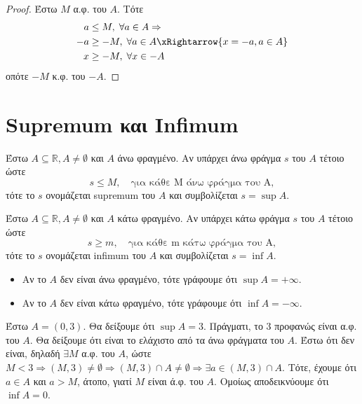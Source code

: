 \documentclass[main.tex]{subfiles}
\begin{document}
\begin{proof}
    Έστω $M$ α.φ. του $A$. Τότε 
    \begin{align*}
        a &\leq M, \; \forall a \in A \Rightarrow  \\
        -a &\geq -M, \; \forall a \in A \xRightarrow{x= -a, a \in A} \\
        x &\geq -M, \; \forall x \in -A
    \end{align*}
    οπότε $ -M $  κ.φ. του $ -A $.
\end{proof}

\section{Supremum και Infimum}

\begin{dfn}
    Έστω $ A \subseteq \mathbb{R}, A \neq \emptyset $ και $A$ άνω 
    φραγμένο. Αν υπάρχει άνω φράγμα $s$ του $A$ τέτοιο ώστε 
    \[
        s \leq M, \quad \text{για κάθε M άνω φράγμα του A}, 
    \] 
    τότε το $s$ ονομάζεται supremum του $A$ και συμβολίζεται $ s=\sup A $.
\end{dfn}

\begin{dfn}
    Έστω $ A \subseteq \mathbb{R}, A \neq \emptyset $ και $A$ κάτω 
    φραγμένο. Αν υπάρχει κάτω φράγμα $s$ του $A$ τέτοιο ώστε 
    \[
        s \geq m, \quad \text{για κάθε m κάτω φράγμα του A}, 
    \] 
    τότε το $s$ ονομάζεται infimum του $A$ και συμβολίζεται $ s=\inf A $.
\end{dfn}

\begin{rem}
\item {}
    \begin{itemize}
        \item Αν το $A$ δεν είναι άνω φραγμένο, τότε γράφουμε ότι $ \sup A = 
            + \infty $.
        \item Αν το $A$ δεν είναι κάτω φραγμένο, τότε γράφουμε ότι $ \inf A = 
            - \infty $.
    \end{itemize}
\end{rem}

\begin{example}
    Έστω $ A = (0,3) $. Θα δείξουμε ότι $ \sup A = 3 $. Πράγματι, 
    το $ 3 $ προφανώς είναι α.φ. του $A$. Θα δείξουμε ότι είναι το
    ελάχιστο από τα άνω φράγματα του $A$. Έστω ότι δεν είναι, δηλαδή 
    $ \exists M $ α.φ. του $A$, ώστε $ M < 3 \Rightarrow (M,3) \neq 
    \emptyset \Rightarrow (M,3) \cap A \neq \emptyset \Rightarrow \exists 
    a \in (M,3) \cap A $. Τότε, έχουμε ότι $ a \in A $ και $ a > M $, 
    άτοπο, γιατί $M$ είναι ά.φ. του $A$. Ομοίως αποδεικνύουμε ότι $ 
    \inf A = 0$.
\end{example}
\end{document}
